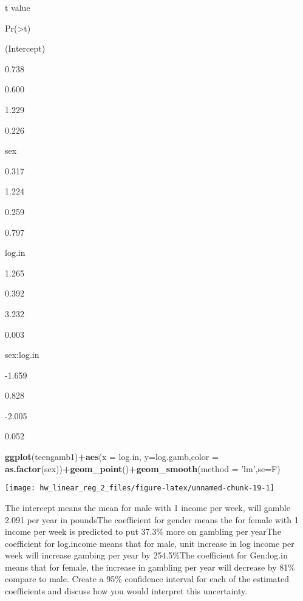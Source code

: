 \documentclass[]{article}
\newenvironment{Shaded}{\begin{snugshade}}{\end{snugshade}}
\newcommand{\DataTypeTok}[1]{\textcolor[rgb]{0.13,0.29,0.53}{#1}}
\newcommand{\KeywordTok}[1]{\textcolor[rgb]{0.13,0.29,0.53}{\textbf{#1}}}
\newcommand{\NormalTok}[1]{#1}
\newcommand{\OperatorTok}[1]{\textcolor[rgb]{0.81,0.36,0.00}{\textbf{#1}}}
\newcommand{\StringTok}[1]{\textcolor[rgb]{0.31,0.60,0.02}{#1}}
\begin{document}
t value

Pr(\textgreater{}\textbar{}t\textbar{})

(Intercept)

0.738

0.600

1.229

0.226

sex

0.317

1.224

0.259

0.797

log.in

1.265

0.392

3.232

0.003

sex:log.in

-1.659

0.828

-2.005

0.052

\begin{Shaded}
\begin{Highlighting}[]
\KeywordTok{ggplot}\NormalTok{(teengamb1)}\OperatorTok{+}\KeywordTok{aes}\NormalTok{(}\DataTypeTok{x =}\NormalTok{ log.in, }\DataTypeTok{y=}\NormalTok{log.gamb,}\DataTypeTok{color =} \KeywordTok{as.factor}\NormalTok{(sex))}\OperatorTok{+}\KeywordTok{geom_point}\NormalTok{()}\OperatorTok{+}\KeywordTok{geom_smooth}\NormalTok{(}\DataTypeTok{method =} \StringTok{'lm'}\NormalTok{,}\DataTypeTok{se=}\NormalTok{F)}
\end{Highlighting}
\end{Shaded}

\begin{center}\texttt{[image: hw\_linear\_reg\_2\_files/figure-latex/unnamed-chunk-19-1]} \end{center}

The intercept means the mean for male with 1 income per week, will
gamble 2.091 per year in pounds\newline The coefficient for gender means
the for female with 1 income per week is predicted to put 37.3\% more on
gambling per year\newline The coefficient for log.income means that for
male, unit increase in log income per week will increase gambing per
year by 254.5\%\newline The coefficient for Gen:log.in means that for
female, the increase in gambling per year will decrease by 81\% compare
to male. Create a 95\% confidence interval for each of the
estimated coefficients and discuss how you would interpret this
uncertainty.
\end{document}
